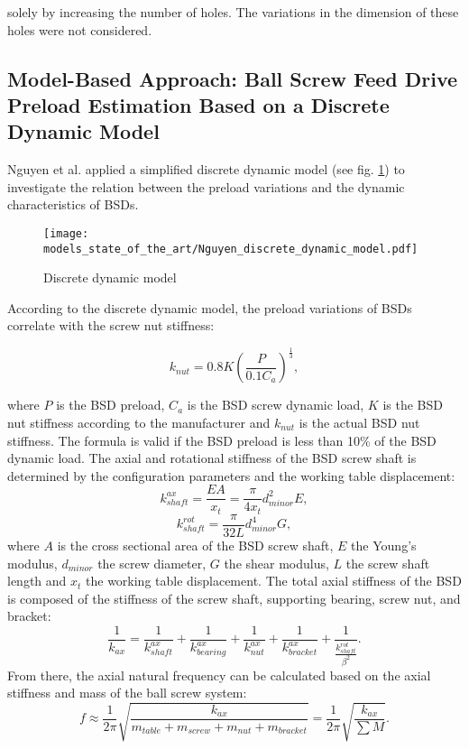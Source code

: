 solely by increasing the number of holes. The variations in the dimension of these holes were not considered.

\subsection{Model-Based Approach: Ball Screw Feed Drive Preload Estimation Based on a Discrete Dynamic Model}
Nguyen et al. \cite{NGUYEN2019} applied a simplified discrete dynamic model (see fig. \ref{fig:Nguyen_discrete_dynamic_model}) to investigate the relation between the preload variations and the dynamic characteristics of BSDs.

\begin{figure}[H]
  \centering
  \texttt{[image: models\_state\_of\_the\_art/Nguyen\_discrete\_dynamic\_model.pdf]}
  \caption{Discrete dynamic model \cite{NGUYEN2019}}
  \label{fig:Nguyen_discrete_dynamic_model}
\end{figure}

According to the discrete dynamic model, the preload variations of BSDs correlate with the screw nut stiffness:

\begin{equation}
    k_{nut}=0.8K(\frac{P}{0.1C_{a}})^{\frac{1}{3}},
\end{equation}

where $P$ is the BSD preload, $C_{a}$ is the BSD screw dynamic load, $K$ is the BSD nut stiffness according to the manufacturer and $k_{nut}$ is the actual BSD nut stiffness. The formula is valid if the BSD preload is less than 10\% of the BSD dynamic load. The axial and rotational stiffness of the BSD screw shaft is determined by the configuration parameters and the working table displacement:
\begin{equation}
    k_{shaft}^{ax}=\frac{EA}{x_{t}}=\frac{\pi}{4x_{t}}d_{minor}^{2}E,
\end{equation}
\begin{equation}
    k_{shaft}^{rot}=\frac{\pi}{32L}d_{minor}^{4}G,
\end{equation}
 where $A$ is the cross sectional area of the BSD screw shaft, $E$ the Young’s modulus, $d_{minor}$ the screw diameter, $G$ the shear modulus, $L$ the screw shaft length and $x_{t}$ the working table displacement. The total axial stiffness of the BSD is composed of the stiffness of the screw shaft, supporting bearing, screw nut, and bracket:
 \begin{equation}
    \frac{1}{k_{ax}}=\frac{1}{k_{shaft}^{ax}}+\frac{1}{k_{bearing}^{ax}}+\frac{1}{k_{nut}^{ax}}+\frac{1}{k_{bracket}^{ax}}+\frac{1}{\frac{k_{shaft}^{rot}}{\beta^{2}}}.
\end{equation}
From there, the axial natural frequency can be calculated based on the axial stiffness and mass of the ball screw system:
\begin{equation}
    f\approx\frac{1}{2\pi}\sqrt{\frac{k_{ax}}{m_{table}+m_{screw}+m_{nut}+m_{bracket}}}=\frac{1}{2\pi}\sqrt{\frac{k_{ax}}{\sum M}}.
\end{equation}

